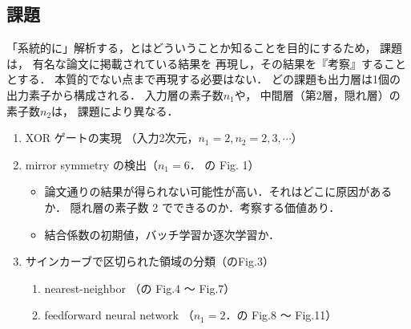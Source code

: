 \documentclass[a4paper,11pt]{jarticle}
\begin{document}
\subsection{課題}
「系統的に」解析する，とはどういうことか知ることを目的にするため，
課題は，
有名な論文\cite{rumelhart86b,sgeman92a}に掲載されている結果を
再現し，その結果を『考察』することとする．
本質的でない点まで再現する必要はない．
どの課題も出力層は1個の出力素子から構成される．
入力層の素子数$n_1$や，
中間層（第2層，隠れ層）の素子数$n_2$は，
課題により異なる．
\rhead{}
\begin{enumerate}
\item XOR ゲートの実現 （入力2次元，$n_1=2, n_2=2,3,\cdots$）
\item mirror symmetry の検出（$n_1=6$． \cite{rumelhart86b}の Fig. 1）
 \begin{itemize}
  \item 論文通りの結果が得られない可能性が高い．それはどこに原因があるか．
	隠れ層の素子数 2 でできるのか．考察する価値あり．
  \item 結合係数の初期値，バッチ学習か逐次学習か．

 \end{itemize}



 \item サインカーブで区切られた領域の分類（\cite{sgeman92a}のFig.3）

\begin{enumerate}
 \item nearest-neighbor （\cite{sgeman92a}の
       Fig.4 〜 Fig.7）
 \item feedforward neural network
       （$n_1=2$．\cite{sgeman92a}の
       Fig.8 〜 Fig.11）
\end{enumerate}

\end{enumerate}
\end{document}
